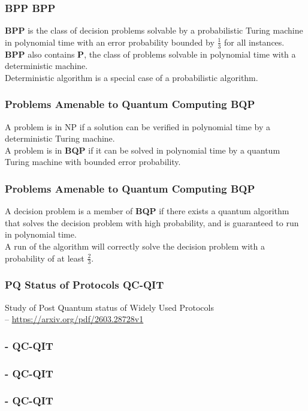 \documentclass[12pt]{beamer}
\newcommand{\FrameTitle}[2]{\frametitle{#1 \hfill \small\textnormal{\textcolor{midgray}{#2}}}}
\newcommand{\nl}{\vspace*{1em}\\}
\newcommand{\vsp}{\vspace*{1em}}
\begin{document}
\begin{frame}\FrameTitle{BPP}{BPP}
    \textbf{BPP} is the class of decision problems solvable by a probabilistic Turing machine in
    polynomial time with an error probability bounded by $\frac{1}{3}$ for all instances.\nl

    \textbf{BPP}  also contains \textbf{P}, the class of problems solvable in
    polynomial time with a deterministic machine.\nl

    Deterministic algorithm is a special case of a probabilistic algorithm.
\end{frame}


\begin{frame}\FrameTitle{Problems Amenable to Quantum Computing}{BQP}
    A problem is in NP if a solution can be verified in polynomial time by
    a deterministic Turing machine.\nl

    A problem is in \textbf{BQP} if it can be solved in polynomial time by a
    quantum Turing machine with bounded error probability.\nl
\end{frame}


\begin{frame}\FrameTitle{Problems Amenable to Quantum Computing}{BQP}
    \vspace*{4pt}
        A decision problem is a member of \textbf{BQP} if there exists a quantum algorithm
        that solves the decision problem with high probability, and is guaranteed
        to run in polynomial time. \vsp\nl
        A run of the algorithm will correctly solve the decision problem with a probability of at least $\frac{2}{3}$.
\end{frame}


\begin{frame}\FrameTitle{PQ Status of Protocols}{QC-QIT}
    Study of Post Quantum status of Widely Used Protocols\vspace*{1pt} \\
    \quad -- \url{https://arxiv.org/pdf/2603.28728v1}
\end{frame}

\begin{frame}\FrameTitle{-}{QC-QIT}
\end{frame}

\begin{frame}\FrameTitle{-}{QC-QIT}
\end{frame}

\begin{frame}\FrameTitle{-}{QC-QIT}
\end{frame}
\end{document}
